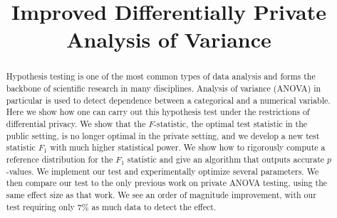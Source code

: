 \documentclass[USenglish,oneside,twocolumn]{article}
\begin{document}
 

%
%
%
%
%
%
%

  \title{\huge Improved Differentially Private Analysis of Variance}



\begin{abstract}
{Hypothesis testing is one of the most common types of data analysis and forms the backbone of scientific research in many disciplines.  Analysis of variance (ANOVA) in particular is used to detect dependence between a categorical and a numerical variable.  Here we show how one can carry out this hypothesis test under the restrictions of differential privacy.  We show that the $F$-statistic, the optimal test statistic in the public setting, is no longer optimal in the private setting, and we develop a new test statistic $F_1$ with much higher statistical power.  We show how to rigorously compute a reference distribution for the $F_1$ statistic and give an algorithm that outputs accurate $p$-values.  We implement our test and experimentally optimize several parameters.  We then compare our test to the only previous work on private ANOVA testing, using the same effect size as that work.  We see an order of magnitude improvement, with our test requiring only 7\% as much data to detect the effect.}
\end{abstract}


 

\maketitle






%
%
%
%
%




\appendix


%

%


\end{document}
